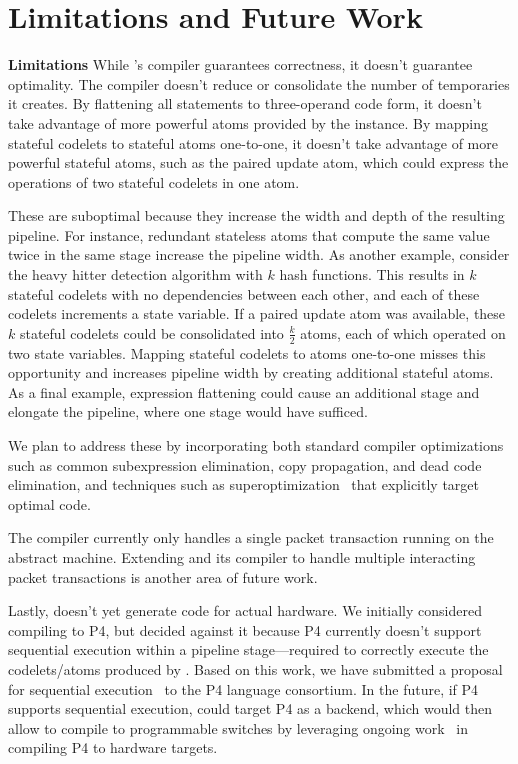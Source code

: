\section{Limitations and Future Work}
\label{s:limitations}

\textbf{Limitations}
While \pktlanguage's compiler guarantees correctness, it doesn't guarantee
optimality.  The \pktlanguage compiler doesn't reduce or consolidate the number
of temporaries it creates. By flattening all statements to three-operand code
form, it doesn't take advantage of more powerful atoms provided by the
\absmachine instance. By mapping stateful codelets to stateful atoms
one-to-one, it doesn't take advantage of more powerful stateful atoms, such as
the paired update atom, which could express the operations of two stateful
codelets in one atom.

These are suboptimal because they increase the width and depth of the resulting
pipeline. For instance, redundant stateless atoms that compute the same value
twice in the same stage increase the pipeline width. As another example,
consider the heavy hitter detection algorithm with $k$ hash functions.  This
results in $k$ stateful codelets with no dependencies between each other, and
each of these codelets increments a state variable. If a paired update atom was
available, these $k$ stateful codelets could be consolidated into $\frac{k}{2}$
atoms, each of which operated on two state variables.  Mapping stateful
codelets to atoms one-to-one misses this opportunity and increases pipeline
width by creating additional stateful atoms.  As a final example, expression
flattening could cause an additional stage and elongate the pipeline, where one
stage would have sufficed.

We plan to address these by incorporating both standard compiler optimizations
such as common subexpression elimination, copy propagation, and dead code
elimination, and techniques such as superoptimization~\cite{stoke,
superoptimizer} that explicitly target optimal code.

The \pktlanguage compiler currently only handles a single packet transaction
running on the abstract machine.  Extending \pktlanguage and its compiler to
handle multiple interacting packet transactions is another area of future work.

Lastly, \pktlanguage doesn't yet generate code for actual hardware. We
initially considered compiling \pktlanguage to P4, but decided against it
because P4 currently doesn't support sequential execution within a
pipeline stage---required to correctly execute the codelets/atoms produced by
\pktlanguage. Based on this work, we have submitted a proposal for sequential
execution~\cite{p4-semantics} to the P4 language consortium. In the future, if
P4 supports sequential execution, \pktlanguage could target P4 as a backend,
which would then allow \pktlanguage to compile to programmable switches by
leveraging ongoing work~\cite{netronome, xilinx,lavanya_compiler} in compiling
P4 to hardware targets.

